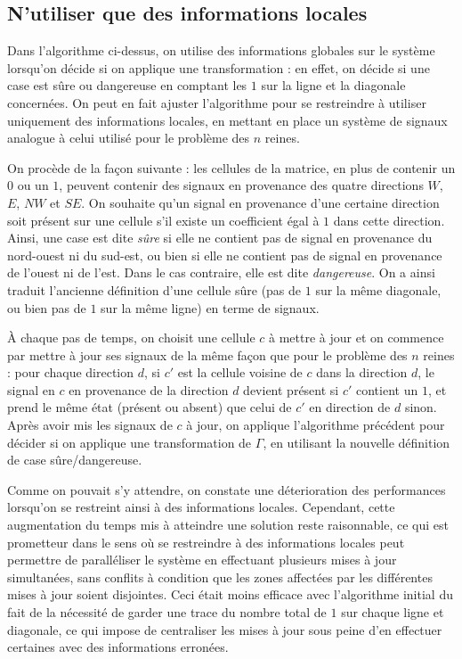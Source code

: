 \documentclass[11pt, openany]{article}
\begin{document}
\subsection*{N'utiliser que des informations locales}

Dans l'algorithme ci-dessus, on utilise des informations globales sur le système lorsqu'on décide si on applique une transformation : en effet, on décide si une case est sûre ou dangereuse en comptant les $1$ sur la ligne et la diagonale concernées. On peut en fait ajuster l'algorithme pour se restreindre à utiliser uniquement des informations locales, en mettant en place un système de signaux analogue à celui utilisé pour le problème des $n$ reines. 

On procède de la façon suivante : les cellules de la matrice, en plus de contenir un $0$ ou un $1$, peuvent contenir des signaux en provenance des quatre directions $W$, $E$, $NW$ et $SE$. On souhaite qu'un signal en provenance d'une certaine direction soit présent sur une cellule s'il existe un coefficient égal à $1$ dans cette direction. Ainsi, une case est dite \emph{sûre} si elle ne contient pas de signal en provenance du nord-ouest ni du sud-est, ou bien si elle ne contient pas de signal en provenance de l'ouest ni de l'est. Dans le cas contraire, elle est dite \emph{dangereuse}. On a ainsi traduit l'ancienne définition d'une cellule sûre (pas de $1$ sur la même diagonale, ou bien pas de $1$ sur la même ligne) en terme de signaux.

À chaque pas de temps, on choisit une cellule $c$ à mettre à jour et on commence par mettre à jour ses signaux de la même façon que pour le problème des $n$ reines : pour chaque direction $d$, si $c'$ est la cellule voisine de $c$ dans la direction $d$, le signal en $c$ en provenance de la direction $d$ devient présent si $c'$ contient un $1$, et prend le même état (présent ou absent) que celui de $c'$ en direction de $d$ sinon.
Après avoir mis les signaux de $c$ à jour, on applique l'algorithme précédent pour décider si on applique une transformation de $\Gamma$, en utilisant la nouvelle définition de case sûre/dangereuse. 

Comme on pouvait s'y attendre, on constate une déterioration des performances lorsqu'on se restreint ainsi à des informations locales. Cependant, cette augmentation du temps mis à atteindre une solution reste raisonnable, ce qui est prometteur dans le sens où se restreindre à des informations locales peut permettre de paralléliser le système en effectuant plusieurs mises à jour simultanées, sans conflits à condition que les zones affectées par les différentes mises à jour soient disjointes. Ceci était moins efficace avec l'algorithme initial du fait de la nécessité de garder une trace du nombre total de $1$ sur chaque ligne et diagonale, ce qui impose de centraliser les mises à jour sous peine d'en effectuer certaines avec des informations erronées.


\nocite{Pom96}
\nocite{BahiC06}
\nocite{Fat13}



\end{document}
